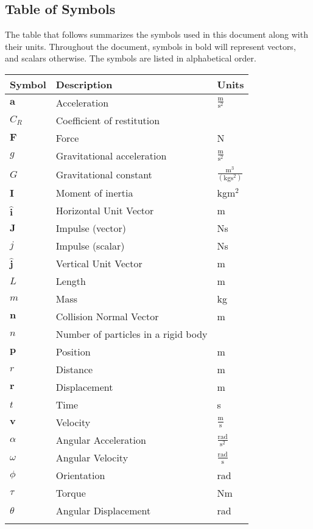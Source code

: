 \documentclass[12pt]{article}
\begin{document}
\subsection{Table of Symbols}
\label{Sec:ToS}
The table that follows summarizes the symbols used in this document along with their units. Throughout the document, symbols in bold will represent vectors, and scalars otherwise. The symbols are listed in alphabetical order.
\begin{longtable*}{l l l}
\toprule
Symbol & Description & Units
\\
\midrule
$\mathbf{a}$ & Acceleration & $\frac{\text{m}}{\text{s}^{2}}$
\\
$C_{R}$ & Coefficient of restitution & 
\\
$\mathbf{F}$ & Force & N
\\
$g$ & Gravitational acceleration & $\frac{\text{m}}{\text{s}^{2}}$
\\
$G$ & Gravitational constant & $\frac{\text{m}^{3}}{(\text{kg}\text{s}^{2})}$
\\
$\mathbf{I}$ & Moment of inertia & kg$\text{m}^{2}$
\\
$\mathbf{\hat{i}}$ & Horizontal Unit Vector & m
\\
$\mathbf{J}$ & Impulse (vector) & Ns
\\
$j$ & Impulse (scalar) & Ns
\\
$\mathbf{\hat{j}}$ & Vertical Unit Vector & m
\\
$L$ & Length & m
\\
$m$ & Mass & kg
\\
$\mathbf{n}$ & Collision Normal Vector & m
\\
$n$ & Number of particles in a rigid body & 
\\
$\mathbf{p}$ & Position & m
\\
$r$ & Distance & m
\\
$\mathbf{r}$ & Displacement & m
\\
$t$ & Time & s
\\
$\mathbf{v}$ & Velocity & $\frac{\text{m}}{\text{s}}$
\\
$\alpha{}$ & Angular Acceleration & $\frac{\text{rad}}{\text{s}^{2}}$
\\
$\omega{}$ & Angular Velocity & $\frac{\text{rad}}{\text{s}}$
\\
$\phi{}$ & Orientation & rad
\\
$\tau{}$ & Torque & Nm
\\
$\theta{}$ & Angular Displacement & rad
\\
\bottomrule
\label{Table:ToS}
\end{longtable*}
\end{document}
